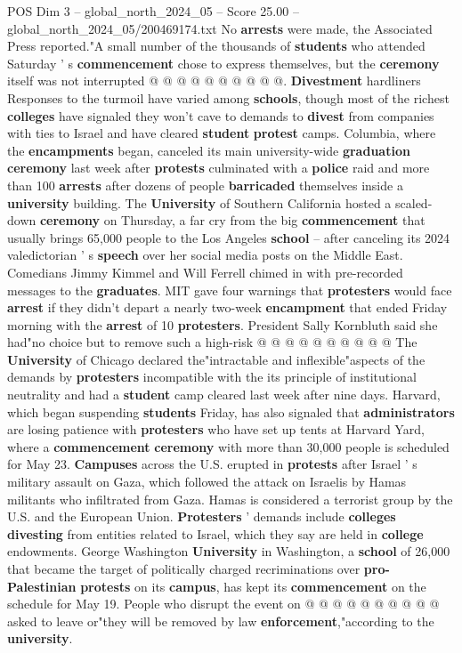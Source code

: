 \begin{textsample}{POS Dim 3 – global\_north\_2024\_05 – Score 25.00 – global\_north\_2024\_05/200469174.txt}
No \textbf{arrests} were made, the Associated Press reported."A small number of the thousands of \textbf{students} who attended Saturday ' s \textbf{commencement} chose to express themselves, but the \textbf{ceremony} itself was not interrupted @ @ @ @ @ @ @ @ @ @. \textbf{Divestment} hardliners Responses to the turmoil have varied among \textbf{schools}, though most of the richest \textbf{colleges} have signaled they won't cave to demands to \textbf{divest} from companies with ties to Israel and have cleared \textbf{student} \textbf{protest} camps.
Columbia, where the \textbf{encampments} began, canceled its main university-wide \textbf{graduation} \textbf{ceremony} last week after \textbf{protests} culminated with a \textbf{police} raid and more than 100 \textbf{arrests} after dozens of people \textbf{barricaded} themselves inside a \textbf{university} building.
The \textbf{University} of Southern California hosted a scaled-down \textbf{ceremony} on Thursday, a far cry from the big \textbf{commencement} that usually brings 65,000 people to the Los Angeles \textbf{school} -- after canceling its 2024 valedictorian ' s \textbf{speech} over her social media posts on the Middle East.
Comedians Jimmy Kimmel and Will Ferrell chimed in with pre-recorded messages to the \textbf{graduates}.
MIT gave four warnings that \textbf{protesters} would face \textbf{arrest} if they didn't depart a nearly two-week \textbf{encampment} that ended Friday morning with the \textbf{arrest} of 10 \textbf{protesters}.
President Sally Kornbluth said she had"no choice but to remove such a high-risk @ @ @ @ @ @ @ @ @ @ The \textbf{University} of Chicago declared the"intractable and inflexible"aspects of the demands by \textbf{protesters} incompatible with the its principle of institutional neutrality and had a \textbf{student} camp cleared last week after nine days.
Harvard, which began suspending \textbf{students} Friday, has also signaled that \textbf{administrators} are losing patience with \textbf{protesters} who have set up tents at Harvard Yard, where a \textbf{commencement} \textbf{ceremony} with more than 30,000 people is scheduled for May 23. \textbf{Campuses} across the U.S. erupted in \textbf{protests} after Israel ' s military assault on Gaza, which followed the attack on Israelis by Hamas militants who infiltrated from Gaza.
Hamas is considered a terrorist group by the U.S. and the European Union. \textbf{Protesters} ' demands include \textbf{colleges} \textbf{divesting} from entities related to Israel, which they say are held in \textbf{college} endowments.
George Washington \textbf{University} in Washington, a \textbf{school} of 26,000 that became the target of politically charged recriminations over \textbf{pro-Palestinian} \textbf{protests} on its \textbf{campus}, has kept its \textbf{commencement} on the schedule for May 19.
People who disrupt the event on @ @ @ @ @ @ @ @ @ @ asked to leave or"they will be removed by law \textbf{enforcement},"according to the \textbf{university}.


\end{textsample}

